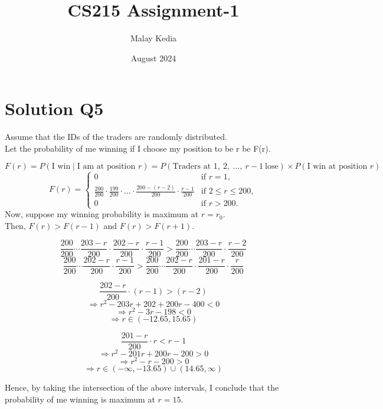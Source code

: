 \documentclass{article}
\title{CS215 Assignment-1}
\author{Malay Kedia}
\date{August 2024}
\begin{document}
\maketitle

\section{Solution Q5}

Assume that the IDs of the traders are randomly distributed.\\
Let the probability of me winning if I choose my position to be r be F(r).

\[
F(r) = P\left(\text{I win} \mid \text{I am at position } r\right) = P\left(\text{Traders at } 1,\ 2,\ \ldots,\ r-1\ \text{lose}\right) \times P\left(\text{I win at position } r\right)
\]
\[
F(r) =
\begin{cases} 
0 & \text{if } r = 1, \\
\frac{200}{200} \cdot \frac{199}{200} \cdot \ldots \cdot \frac{200-(r-2)}{200} \cdot \frac{r - 1}{200} & \text{if } 2 \leq r \leq 200, \\
0 & \text{if } r > 200.
\end{cases}
\]
Now, suppose my winning probability is maximum at $r=r_0$.\\
Then, $F(r) > F(r-1)$ and $F(r)>F(r+1)$.

\[
\frac{200}{200} \cdots \frac{203-r}{200} \cdot \frac{202-r}{200} \cdot \frac{r - 1}{200} > \frac{200}{200} \cdots \frac{203-r}{200} \cdot \frac{r - 2}{200}
\]
\[
\frac{200}{200} \cdots \frac{202-r}{200} \cdot \frac{r - 1}{200} > \frac{200}{200} \cdots \frac{202-r}{200} \cdot \frac{201-r}{200} \cdot \frac{r}{200}
\]

\vspace{0.5 cm}

\begin{minipage}{0.45\textwidth}
\raggedright
\[
\frac{202-r}{200} \cdot (r-1) > (r-2)
\]
\[
\Rightarrow r^2 - 203r + 202 + 200r - 400 < 0
\]
\[
\Rightarrow r^2 - 3r - 198 < 0
\]
\[
\Rightarrow r \in (-12.65, 15.65)
\]
\end{minipage}
\hfill
\begin{minipage}{0.45\textwidth}
\raggedright
\[
\frac{201-r}{200} \cdot r < r-1
\]
\[
\Rightarrow r^2 - 201r + 200r - 200 > 0
\]
\[
\Rightarrow r^2 - r - 200 > 0
\]
\[
\Rightarrow r \in (-\infty, -13.65) \cup (14.65, \infty)
\]
\end{minipage}

\vspace{0.5 cm}
Hence, by taking the intersection of the above intervals, I conclude that the probability of me winning is maximum at $r=15$.
\end{document}
